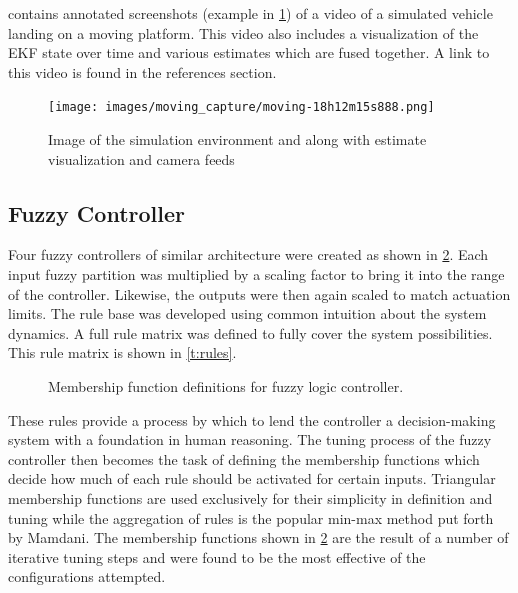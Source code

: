 contains annotated screenshots (example in \cref{f:sim_moving_shot}) of a video of a
simulated vehicle landing on a moving platform. This video also includes a visualization of the EKF state over
time and various estimates which are fused together. A link to this video is found in the references
section\cite{yt_dyn}.

\begin{figure}
    \centering
    \texttt{[image: images/moving\_capture/moving-18h12m15s888.png]}
    \caption{Image of the simulation environment and along with estimate visualization and camera
    feeds}\label{f:sim_moving_shot}
\end{figure}


\subsection{Fuzzy Controller}
Four fuzzy controllers of similar architecture were created as shown in \cref{f:fuzzy_mfs}.
Each input fuzzy partition was multiplied by a scaling factor to bring it into the range of the controller.
Likewise, the outputs were then again scaled to match actuation limits. The rule base was developed using
common intuition about the system dynamics. A full rule matrix was defined to fully cover the system
possibilities. This rule matrix is shown in \cref{t:rules}.
\begin{figure}[ht]
    \begin{subfigmatrix}{2}
    \end{subfigmatrix}
    \caption{Membership function definitions for fuzzy logic controller.}\label{f:fuzzy_mfs}
\end{figure}

These rules provide a process by which to lend the controller a
decision-making system with a foundation in human reasoning. The tuning process of the fuzzy controller then
becomes the task of defining the membership functions which decide how much of each rule should be activated
for certain inputs. Triangular membership functions are used exclusively for their simplicity in definition
and tuning\cite{mishra1994performance} while the aggregation of rules is the popular min-max method put forth
by Mamdani\cite{MAMDANI19751}. The membership functions shown in \cref{f:fuzzy_mfs} are the result of a number
of iterative tuning steps and were found to be the most effective of the configurations attempted.


